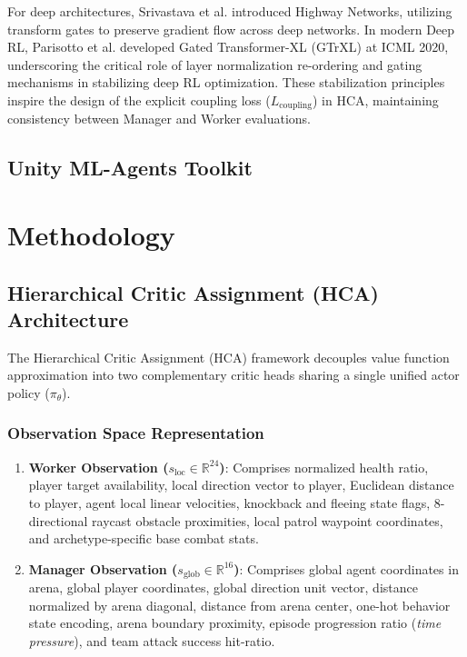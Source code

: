 \documentclass[conference]{IEEEtran}
\begin{document}
For deep architectures, Srivastava et al. \cite{srivastava2015training} introduced Highway Networks, utilizing transform gates to preserve gradient flow across deep networks. In modern Deep RL, Parisotto et al. \cite{parisotto2020stabilizing} developed Gated Transformer-XL (GTrXL) at ICML 2020, underscoring the critical role of layer normalization re-ordering and gating mechanisms in stabilizing deep RL optimization. These stabilization principles inspire the design of the explicit coupling loss (\(L_{\text{coupling}}\)) in HCA, maintaining consistency between Manager and Worker evaluations.

\subsection{Unity ML-Agents Toolkit}
\section{Methodology}

\subsection{Hierarchical Critic Assignment (HCA) Architecture}
The Hierarchical Critic Assignment (HCA) framework decouples value function approximation into two complementary critic heads sharing a single unified actor policy (\(\pi_\theta\)).

\subsubsection{Observation Space Representation}
\begin{enumerate}
    \item \textbf{Worker Observation (\(s_{\text{loc}} \in \mathbb{R}^{24}\))}: Comprises normalized health ratio, player target availability, local direction vector to player, Euclidean distance to player, agent local linear velocities, knockback and fleeing state flags, 8-directional raycast obstacle proximities, local patrol waypoint coordinates, and archetype-specific base combat stats.
    \item \textbf{Manager Observation (\(s_{\text{glob}} \in \mathbb{R}^{16}\))}: Comprises global agent coordinates in arena, global player coordinates, global direction unit vector, distance normalized by arena diagonal, distance from arena center, one-hot behavior state encoding, arena boundary proximity, episode progression ratio (\textit{time pressure}), and team attack success hit-ratio.
\end{enumerate}
\end{document}
